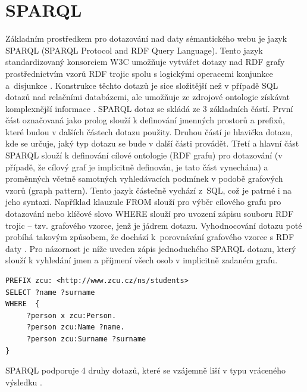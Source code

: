 \documentclass{projekt}
\begin{document}
\section{SPARQL}
\hspace{0.65cm}Základním prostředkem pro dotazování nad daty sémantického webu je jazyk SPARQL (SPARQL Protocol and RDF Query Language). Tento jazyk standardizovaný konsorciem W3C umožňuje vytvářet dotazy nad RDF grafy prostřednictvím vzorů RDF trojic spolu s logickými operacemi konjunkce a~disjunkce \cite{_2}. Konstrukce těchto dotazů je sice složitější než v případě SQL dotazů nad relačními databázemi, ale umožňuje ze zdrojové ontologie získávat komplexnější informace \cite{_3}. SPARQL dotaz se skládá ze 3 základních částí. První část označovaná jako prolog slouží k definování jmenných prostorů a prefixů, které budou v dalších částech dotazu použity. Druhou částí je hlavička dotazu, kde se určuje, jaký typ dotazu se bude v další části provádět. Třetí a hlavní část SPARQL slouží k definování cílové ontologie (RDF grafu) pro dotazování (v případě, že cílový graf je implicitně definován, je tato část vynechána) a proměnných včetně samotných vyhledávacích podmínek v podobě grafových vzorů (graph pattern)\cite{_2}.
Tento jazyk částečně vychází z~SQL, což je patrné i na jeho syntaxi. Například klauzule FROM slouží pro výběr cílového grafu pro dotazování nebo klíčové slovo WHERE slouží pro uvození zápisu souboru RDF trojic – tzv. grafového vzorce, jenž je jádrem dotazu. Vyhodnocování dotazu poté probíhá takovým způsobem, že dochází k~porovnávání grafového vzorce s RDF daty \cite{_13}. 
Pro názornost je níže uveden zápis jednoduchého SPARQL dotazu, který slouží k vyhledání jmen a příjmení všech osob v implicitně zadaném grafu.

\begin{verbatim}
PREFIX zcu: <http://www.zcu.cz/ns/students>
SELECT ?name ?surname
WHERE  {
     ?person x zcu:Person.
     ?person zcu:Name ?name.
     ?person zcu:Surname ?surname
}
\end{verbatim}


SPARQL podporuje 4 druhy dotazů, které se vzájemně liší v typu vráceného výsledku \cite{_13}.
\end{document}
